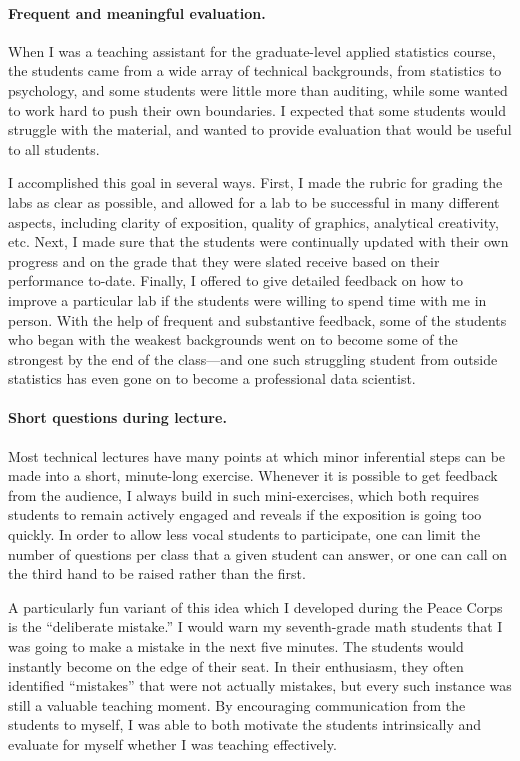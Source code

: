 \paragraph{Frequent and meaningful evaluation.}

When I was a teaching assistant for the graduate-level applied statistics
course, the students came from a wide array of technical backgrounds, from
statistics to psychology, and some students were little more than auditing,
while some wanted to work hard to push their own boundaries.  I expected that
some students would struggle with the material, and wanted to provide evaluation
that would be useful to all students.

I accomplished this goal in several ways. First, I made the rubric for grading
the labs as clear as possible, and allowed for a lab to be successful in many
different aspects, including clarity of exposition, quality of graphics,
analytical creativity, etc.  Next, I made sure that the students were
continually updated with their own progress and on the grade that they were
slated receive based on their performance to-date. Finally, I offered to give
detailed feedback on how to improve a particular lab if the students were
willing to spend time with me in person.  With the help of frequent and
substantive feedback, some of the students who began with the weakest
backgrounds went on to become some of the strongest by the end of the
class---and one such struggling student from outside statistics has even gone on
to become a professional data scientist.


\paragraph{Short questions during lecture.}

Most technical lectures have many points at which minor inferential steps can be
made into a short, minute-long exercise.  Whenever it is possible to get
feedback from the audience, I always build in such mini-exercises, which both
requires students to remain actively engaged and reveals if the exposition is
going too quickly.  In order to allow less vocal students to participate, one
can limit the number of questions per class that a given student can answer, or
one can call on the third hand to be raised rather than the first.

A particularly fun variant of this idea which I developed during the Peace Corps
is the ``deliberate mistake.''  I would warn my seventh-grade math students that
I was going to make a mistake in the next five minutes. The students would
instantly become  on the edge of their seat.  In their enthusiasm, they often
identified ``mistakes'' that were not actually mistakes, but every such instance
was still a valuable teaching moment.  By encouraging communication from the
students to myself, I was able to both motivate the students intrinsically and
evaluate for myself whether I was teaching effectively.

